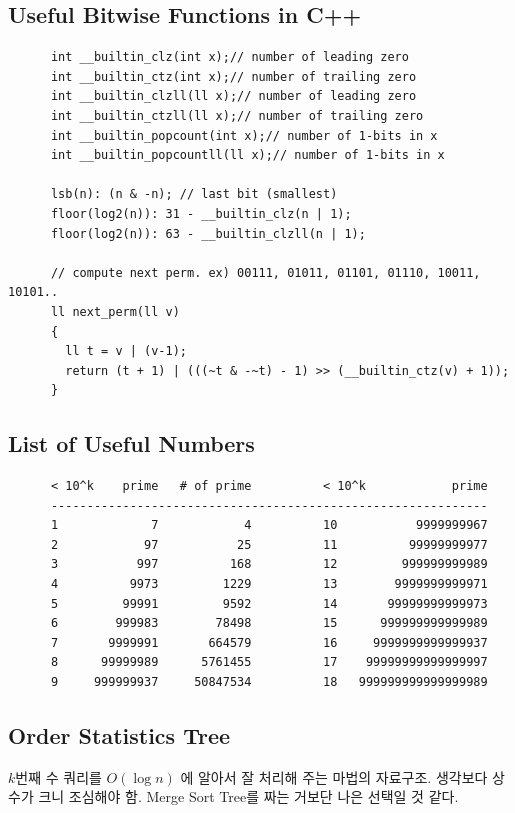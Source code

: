 \documentclass[landscape,8pt]{article}
\begin{document}
\begin{multicols}{2}
  \subsection{Useful Bitwise Functions in C++}
    \begin{verbatim}
      int __builtin_clz(int x);// number of leading zero
      int __builtin_ctz(int x);// number of trailing zero
      int __builtin_clzll(ll x);// number of leading zero
      int __builtin_ctzll(ll x);// number of trailing zero
      int __builtin_popcount(int x);// number of 1-bits in x
      int __builtin_popcountll(ll x);// number of 1-bits in x

      lsb(n): (n & -n); // last bit (smallest)
      floor(log2(n)): 31 - __builtin_clz(n | 1);
      floor(log2(n)): 63 - __builtin_clzll(n | 1);

      // compute next perm. ex) 00111, 01011, 01101, 01110, 10011, 10101..
      ll next_perm(ll v)
      {
        ll t = v | (v-1);
        return (t + 1) | (((~t & -~t) - 1) >> (__builtin_ctz(v) + 1));
      }
    \end{verbatim}
  \subsection{List of Useful Numbers}
    \begin{verbatim}
      < 10^k    prime   # of prime          < 10^k            prime
      -------------------------------------------------------------
      1             7            4          10           9999999967
      2            97           25          11          99999999977
      3           997          168          12         999999999989
      4          9973         1229          13        9999999999971
      5         99991         9592          14       99999999999973
      6        999983        78498          15      999999999999989
      7       9999991       664579          16     9999999999999937
      8      99999989      5761455          17    99999999999999997
      9     999999937     50847534          18   999999999999999989
    \end{verbatim}
  \subsection{Order Statistics Tree}
    $k$번째 수 쿼리를 $O(\log n)$ 에 알아서 잘 처리해 주는 마법의 자료구조. 생각보다 상수가 크니 조심해야 함. Merge Sort Tree를 짜는 거보단 나은 선택일 것 같다.
    


\end{multicols}
\end{document}
